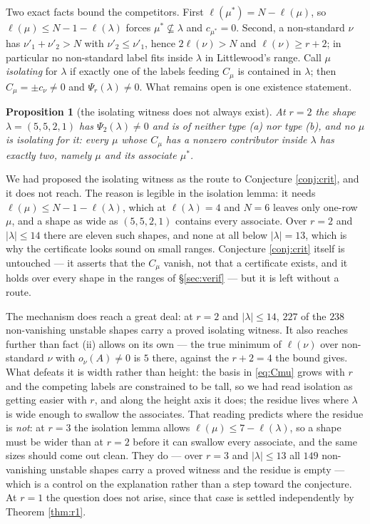 \documentclass[11pt,reqno]{amsart}
\theoremstyle{plain}
\newtheorem{proposition}[theorem]{Proposition}
\theoremstyle{definition}
\begin{document}
Two exact facts bound the competitors. First $\ell(\mu^{*})=N-\ell(\mu)$, so $\ell(\mu)\le
N-1-\ell(\lambda)$ forces $\mu^{*}\not\subseteq\lambda$ and $c_{\mu^{*}}=0$. Second, a non-standard
$\nu$ has $\nu'_1+\nu'_2>N$ with $\nu'_2\le\nu'_1$, hence $2\ell(\nu)>N$ and $\ell(\nu)\ge r+2$; in
particular no non-standard label fits inside $\lambda$ in Littlewood's range. Call $\mu$
\emph{isolating} for $\lambda$ if exactly one of the labels feeding $C_\mu$ is contained in
$\lambda$; then $C_\mu=\pm c_\nu\ne0$ and $\Psi_r(\lambda)\ne0$. What remains open is one existence
statement.

\begin{proposition}[the isolating witness does not always exist]\label{conj:iso}
At $r=2$ the shape $\lambda=(5,5,2,1)$ has $\Psi_2(\lambda)\ne0$ and is of neither type {\rm(a)} nor
type {\rm(b)}, and no $\mu$ is isolating for it: every $\mu$ whose $C_\mu$ has a nonzero contributor
inside $\lambda$ has exactly two, namely $\mu$ and its associate $\mu^{*}$.
\end{proposition}

We had proposed the isolating witness as the route to Conjecture \ref{conj:crit}, and it does not
reach. The reason is legible in the isolation lemma: it needs $\ell(\mu)\le N-1-\ell(\lambda)$, which
at $\ell(\lambda)=4$ and $N=6$ leaves only one-row $\mu$, and a shape as wide as $(5,5,2,1)$ contains
every associate. Over $r=2$ and $|\lambda|\le14$ there are eleven such shapes, and none at all below
$|\lambda|=13$, which is why the certificate looks sound on small ranges. Conjecture \ref{conj:crit}
itself is untouched --- it asserts that the $C_\mu$ vanish, not that a certificate exists, and it
holds over every shape in the ranges of \S\ref{sec:verif} --- but it is left without a route.

The mechanism does reach a great deal: at $r=2$ and $|\lambda|\le14$, $227$ of the $238$ non-vanishing
unstable shapes carry a proved isolating witness. It also reaches further than fact (ii) allows on
its own --- the true minimum of $\ell(\nu)$ over non-standard $\nu$ with $o_\nu(A)\ne0$ is $5$ there,
against the $r+2=4$ the bound gives. What defeats it is width rather than height: the basis in
\eqref{eq:Cmu} grows with $r$ and the competing labels are constrained to be tall, so we had read
isolation as getting easier with $r$, and along the height axis it does; the residue lives where
$\lambda$ is wide enough to swallow the associates. That reading predicts where the residue is
\emph{not}: at $r=3$ the isolation lemma allows $\ell(\mu)\le7-\ell(\lambda)$, so a shape must be
wider than at $r=2$ before it can swallow every associate, and the same sizes should come out clean.
They do --- over $r=3$ and $|\lambda|\le13$ all $149$ non-vanishing unstable shapes carry a proved
witness and the residue is empty --- which is a control on the explanation rather than a step toward
the conjecture. At $r=1$ the question does not arise, since that case is settled independently by
Theorem \ref{thm:r1}.
\end{document}
